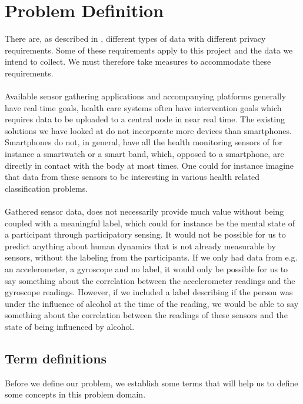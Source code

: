 
\section{Problem Definition} 
\label{sec:problem_definition}
There are, as described in , different types of data with different privacy requirements. Some of these requirements apply to this project and the data we intend to collect. We must therefore take measures to accommodate these requirements.
\\\\
Available sensor gathering applications and accompanying platforms generally have real time goals, health care systems often have intervention goals which requires data to be uploaded to a central node in near real time. The existing solutions we have looked at do not incorporate more devices than smartphones. Smartphones do not, in general, have all the health monitoring sensors of for instance a smartwatch or a smart band, which, opposed to a smartphone, are directly in contact with the body at most times. One could for instance imagine that data from these sensors to be interesting in various health related classification problems. 
\\\\
Gathered sensor data, does not necessarily provide much value without being coupled with a meaningful label, which could for instance be the mental state of a participant through participatory sensing. It would not be possible for us to predict anything about human dynamics that is not already measurable by sensors, without the labeling from the participants. If we only had data from e.g. an accelerometer, a gyroscope and no label, it would only be possible for us to say something about the correlation between the accelerometer readings and the gyroscope readings. However, if we included a label describing if the person was under the influence of alcohol at the time of the reading, we would be able to say something about the correlation between the readings of these sensors and the state of being influenced by alcohol. 

\subsection{Term definitions}
Before we define our problem, we establish some terms that will help us to define some concepts in this problem domain. 

